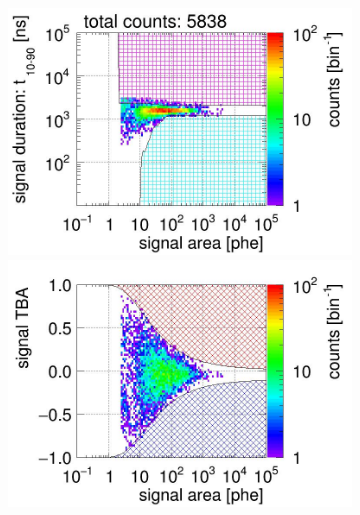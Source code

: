 \begin{landscape}
\begin{figure}[!p]
\begin{subfigure}[t]{0.32\textwidth}
			\caption{}
			\label{fig:signal selection dv 14 01}
		\end{subfigure}
		\begin{subfigure}[t]{0.32\textwidth}
			\centering
			\includegraphics[width=\figurewidth,clip,trim={0 98 0 15}]{Figures/GasTest/CutsValid/res64769/pdpa23Vecfig64769.jpg}
			\includegraphics[width=\figurewidth,clip,trim={0 98 0 40}]{Figures/GasTest/CutsValid/res64769/tbapa23Vecfig64769.jpg}

\end{subfigure}
\end{figure}
\end{landscape}

